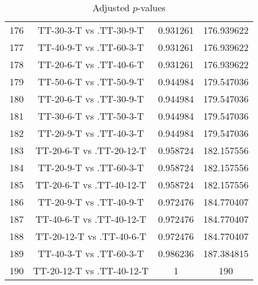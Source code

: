 \documentclass[a4paper,10pt]{article}
\begin{document}
\begin{landscape}
\begin{table}[!htp]
\begin{tabular}{cccc}
176&TT-30-3-T vs .TT-30-9-T&0.931261&176.939622\\
177&TT-40-9-T vs .TT-60-3-T&0.931261&176.939622\\
178&TT-20-6-T vs .TT-40-6-T&0.931261&176.939622\\
179&TT-50-6-T vs .TT-50-9-T&0.944984&179.547036\\
180&TT-20-6-T vs .TT-30-9-T&0.944984&179.547036\\
181&TT-30-6-T vs .TT-50-3-T&0.944984&179.547036\\
182&TT-20-9-T vs .TT-40-3-T&0.944984&179.547036\\
183&TT-20-6-T vs .TT-20-12-T&0.958724&182.157556\\
184&TT-20-9-T vs .TT-60-3-T&0.958724&182.157556\\
185&TT-20-6-T vs .TT-40-12-T&0.958724&182.157556\\
186&TT-20-9-T vs .TT-40-9-T&0.972476&184.770407\\
187&TT-40-6-T vs .TT-40-12-T&0.972476&184.770407\\
188&TT-20-12-T vs .TT-40-6-T&0.972476&184.770407\\
189&TT-40-3-T vs .TT-60-3-T&0.986236&187.384815\\
190&TT-20-12-T vs .TT-40-12-T&1&190\\
\hline
\end{tabular}
\caption{Adjusted $p$-values}
\end{table}

\end{landscape}
\end{document}
